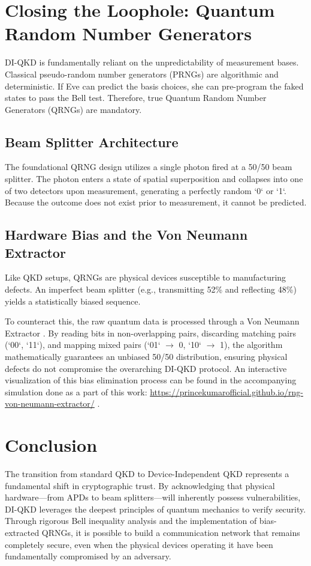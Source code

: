 \section{Closing the Loophole: Quantum Random Number Generators}
DI-QKD is fundamentally reliant on the unpredictability of measurement bases. Classical pseudo-random number generators (PRNGs) are algorithmic and deterministic. If Eve can predict the basis choices, she can pre-program the faked states to pass the Bell test. Therefore, true Quantum Random Number Generators (QRNGs) are mandatory.

\subsection{Beam Splitter Architecture}
The foundational QRNG design utilizes a single photon fired at a 50/50 beam splitter. The photon enters a state of spatial superposition and collapses into one of two detectors upon measurement, generating a perfectly random `0` or `1`. Because the outcome does not exist prior to measurement, it cannot be predicted.

\subsection{Hardware Bias and the Von Neumann Extractor}
Like QKD setups, QRNGs are physical devices susceptible to manufacturing defects. An imperfect beam splitter (e.g., transmitting 52\% and reflecting 48\%) yields a statistically biased sequence. 

To counteract this, the raw quantum data is processed through a Von Neumann Extractor \cite{vonneumann1951}. By reading bits in non-overlapping pairs, discarding matching pairs (`00`, `11`), and mapping mixed pairs (`01` $\to$ 0, `10` $\to$ 1), the algorithm mathematically guarantees an unbiased 50/50 distribution, ensuring physical defects do not compromise the overarching DI-QKD protocol. An interactive visualization of this bias elimination process can be found in the accompanying simulation done as a part of this work: \href{https://princekumarofficial.github.io/rng-von-neumann-extractor/}{https://princekumarofficial.github.io/rng-von-neumann-extractor/} \cite{rng_simulation}.

\section{Conclusion}
The transition from standard QKD to Device-Independent QKD represents a fundamental shift in cryptographic trust. By acknowledging that physical hardware—from APDs to beam splitters—will inherently possess vulnerabilities, DI-QKD leverages the deepest principles of quantum mechanics to verify security. Through rigorous Bell inequality analysis and the implementation of bias-extracted QRNGs, it is possible to build a communication network that remains completely secure, even when the physical devices operating it have been fundamentally compromised by an adversary.

